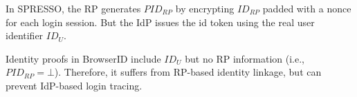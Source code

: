 
%

In SPRESSO, the RP generates $PID_{RP}$ by encrypting $ID_{RP}$ padded with a nonce %
for each login session.  But the IdP issues the id token using the real user identifier $ID_U$.

Identity proofs in BrowserID include $ID_U$ but no RP information (i.e., $PID_{RP} = \bot$). Therefore, it suffers from RP-based identity linkage, but can prevent IdP-based login tracing.

